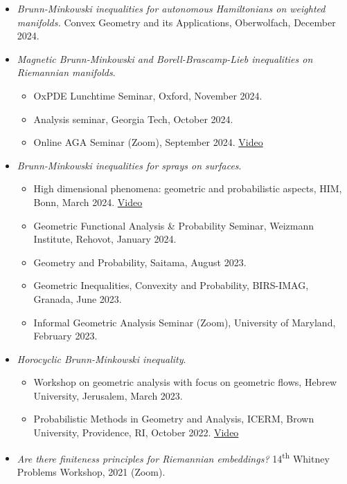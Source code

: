 \documentclass[margin, 10pt]{res}
\begin{document}
\begin{resume}
\begin{itemize}
        \item {\it Brunn-Minkowski inequalities for autonomous Hamiltonians on weighted manifolds.} Convex Geometry and its Applications, Oberwolfach, December 2024.

        \item {\it Magnetic Brunn-Minkowski and Borell-Brascamp-Lieb inequalities on Riemannian manifolds}.
        \begin{itemize}
            \item OxPDE Lunchtime Seminar, Oxford, November 2024.
            \item Analysis seminar, Georgia Tech, October 2024.
            \item Online AGA Seminar (Zoom), September 2024. \href{https://panoptotech.cloud.panopto.eu/Panopto/Pages/Viewer.aspx?id=fd909eb9-e29a-48b8-959f-b1f601029189}{Video}
        \end{itemize}

        \item {\it Brunn-Minkowski inequalities for sprays on surfaces}.
        \begin{itemize}
            \item High dimensional phenomena: geometric and probabilistic aspects, HIM, Bonn, March 2024. \href{https://www.youtube.com/watch?v=O4OKoJ4Up0k&ab_channel=HausdorffCenterforMathematics}{Video}
            \item Geometric Functional Analysis \& Probability Seminar, Weizmann Institute, Rehovot, January 2024.
            \item Geometry and Probability, Saitama, August 2023.
            \item Geometric Inequalities, Convexity and Probability, BIRS-IMAG, Granada, June 2023.
            \item Informal Geometric Analysis Seminar (Zoom), University of Maryland, February 2023.
        \end{itemize}

        \item {\it Horocyclic Brunn-Minkowski inequality}.
        \begin{itemize}
            \item Workshop on geometric analysis with focus on geometric flows, Hebrew University, Jerusalem, March 2023.
             \item Probabilistic Methods in Geometry and Analysis, ICERM, Brown University, Providence, RI, October 2022. \href{https://icerm.brown.edu/video_archive/?play=2994}{Video}
        \end{itemize}

        \item {\it Are there finiteness principles for Riemannian embeddings?} 14\textsuperscript{th} Whitney Problems Workshop, 2021 (Zoom).
    \end{itemize}
\end{resume}
\end{document}
